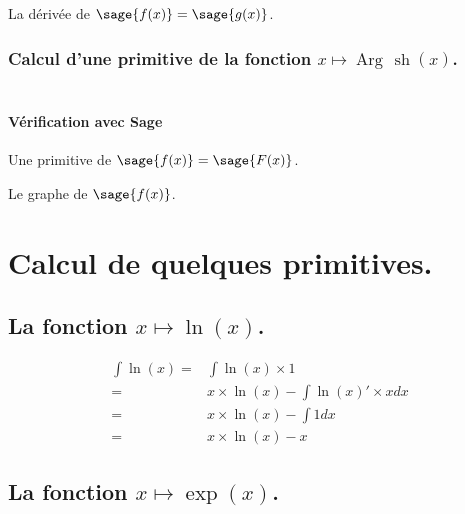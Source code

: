 \documentclass[a4paper,14pt]{extreport} %
\renewcommand{\sinh}{\mathop{\mathrm{sh}}}
\renewcommand{\arg}{\mathop{\mathrm{Arg\,}}}
\begin{document}
La dérivée de $\sage{f(x)} = \sage{g(x)} $.


\subsection{Calcul d'une primitive de la fonction  $x \mapsto \arg\sinh(x)$.}

\begin{align*}
\end{align*}


\subsubsection{Vérification avec Sage}



Une primitive de $\sage{f(x)} = \sage{F(x)} $.

Le graphe de $\sage{f(x)} $.



























\chapter{Calcul de quelques primitives.}

\section{La fonction  $x \mapsto \ln(x) $.}

\begin{align*}
\int \ln(x) = & \int \ln(x) \times 1 \\ = & x \times \ln(x) - \int \ln(x)' \times x dx \\ = & x \times \ln(x) - \int 1 dx \\ = &  x \times \ln(x) - x
\end{align*}


\section{La fonction  $x \mapsto \exp(x) $.}
\end{document}
